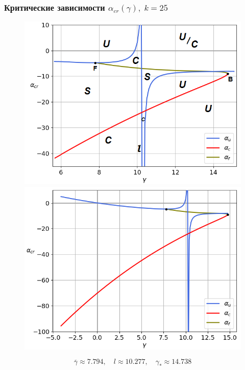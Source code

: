 \documentclass[fullscreen=true, unicode, bookmarks=false]{beamer}
\begin{document}
\begin{frame}
\frametitle{ Критические зависимости $ \alpha_{cr}(\gamma), \; k = 25 $ }

\begin{figure} 
\begin{minipage}[h]{0.49\linewidth}
\begin{center}
\includegraphics[scale=0.36]{scheme25.png} 
\end{center}
\end{minipage} 
\hfill
\begin{minipage}[h]{0.49\linewidth}
\begin{center}
\includegraphics[scale=0.36]{alphas_049.png}
\end{center}
\end{minipage} 
\end{figure}

$$ \overline{\gamma} \approx 7.794, \quad l \approx 10.277, \quad \gamma_* \approx 14.738 $$

\end{frame}
\end{document}
